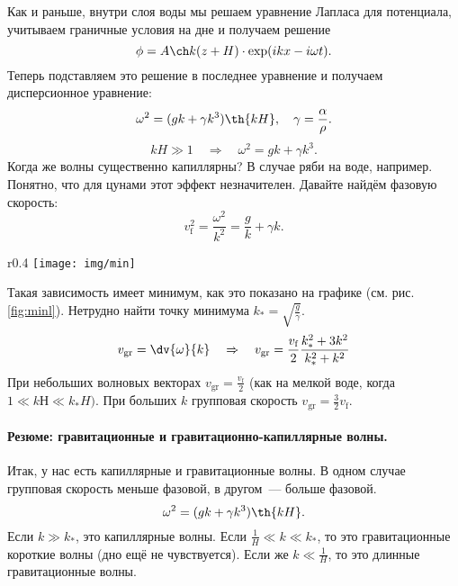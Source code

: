 Как и раньше, внутри слоя воды мы решаем уравнение Лапласа для потенциала, учитываем граничные условия на дне и получаем  решение
\begin{equation}
	\phi=A\ch k(z + H)\cdot \exp(ikx - i\omega t).
\end{equation}
Теперь подставляем это решение в последнее уравнение и получаем дисперсионное уравнение:
\begin{equation}
    \omega^2 = (gk+\gamma k^3)\th{kH}, \quad \gamma = \frac{\alpha}{\rho}.
\end{equation}
\begin{equation*}
    kH \gg 1 \quad \Rightarrow \quad \omega^2 = gk+\gamma k^3.
\end{equation*}
Когда же волны существенно капиллярны? В случае ряби на воде, например. Понятно, что для цунами этот эффект незначителен. Давайте найдём фазовую скорость:
\begin{equation}
    v_\text{f}^2 = \frac{\omega^2}{k^2} = \frac{g}{k}+\gamma k.
\end{equation}
\begin{wrapfigure}[9]{r}{0.4\textwidth}
    \centering
    \vspace{-1em}
    \centering
    \texttt{[image: img/min]}
    \caption{$\lambda_0 = 1.7 \text{ см}$}
    \label{fig:minl}
\end{wrapfigure}
Такая зависимость имеет минимум, как это показано на графике (см. рис. \ref{fig:minl}).
Нетрудно найти точку минимума $k_{*} = \sqrt{\frac{g}{\gamma}}$.
\begin{equation}
    v_\text{gr} = \dv{\omega}{k} \quad \Rightarrow \quad
    v_\text{gr} = \frac{v_\text{f}}{2}\frac{k_{*}^2+3k^2}{k_{*}^2+k^2}
\end{equation}
При небольших волновых векторах $v_\text{gr} = \frac{v_\text{f}}{2}$ (как на мелкой воде, когда $1 \ll kН \ll k_*H)$.
При\! больших\! $k$ групповая\! скорость\! $v_\text{gr} = \frac{3}{2}v_\text{f}$.

\paragraph{Резюме: гравитационные и гравитационно-капиллярные волны.}
Итак, у нас есть капиллярные и гравитационные волны.
В одном случае групповая скорость меньше фазовой, в другом~--- больше фазовой.
\begin{equation}
    \omega^2 = (gk+\gamma k^3)\th{kH}.
\end{equation}
Если $k \gg k_*$, это капиллярные волны.
Если $\frac{1}{H} \ll k \ll k_*$, то это гравитационные короткие волны (дно ещё не чувствуется).
Если же $k \ll \frac{1}{H}$, то это длинные гравитационные волны.



